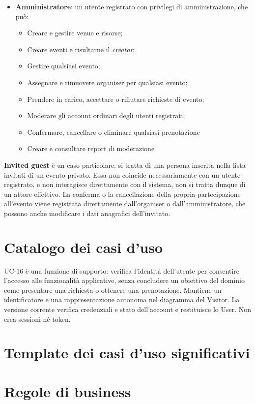 \begin{itemize}
    creare eventi, né assegnare o rimuovere altri organiser, tali sono operazioni riservate agli amministratori.
    \item \textbf{Amministratore}: un utente registrato con privilegi di amministrazione, che può:
    \begin{itemize}
        \item Creare e gestire venue e risorse;
        \item Creare eventi e risultarne il \textit{creator};
        \item Gestire qualsiasi evento;
        \item Assegnare e rimuovere organiser per qualsiasi evento;
        \item Prendere in carico, accettare o rifiutare richieste di evento;
        \item Moderare gli account ordinari degli utenti registrati;
        \item Confermare, cancellare o eliminare qualsiasi prenotazione
        \item Creare e consultare report di moderazione
    \end{itemize}
\end{itemize}
    
\textbf{Invited guest} è un caso particolare: si tratta di una persona inserita nella lista invitati di un evento privato. Essa non coincide necessariamente con 
un utente registrato, e non interagisce direttamente con il sistema, non si tratta dunque di un attore effettivo. La conferma o la cancellazione della propria partecipazione all'evento viene registrata 
direttamente dall'organiser o dall'amministratore, che possono anche modificare i dati anagrafici dell'invitato.




\section{Catalogo dei casi d'uso}

UC-16 è una funzione di supporto: verifica l'identità dell'utente per consentire
l'accesso alle funzionalità applicative, senza concludere un obiettivo del dominio
come presentare una richiesta o ottenere una prenotazione.
Mantiene un identificatore e una rappresentazione autonoma nel diagramma del Visitor.
La versione corrente verifica credenziali e stato dell'account e restituisce lo User. 
Non crea sessioni né token.
\clearpage
\section{Template dei casi d'uso significativi}

\clearpage
\section{Regole di business}

